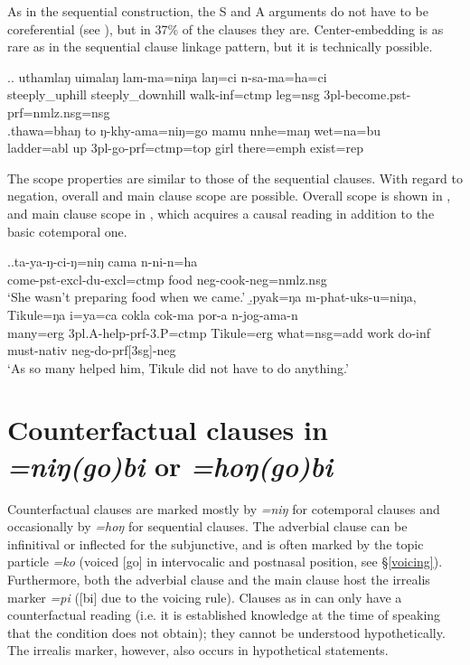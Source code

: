 As in the sequential construction, the S and A arguments do not have to be coreferential (see \Next), but in 37\% of the clauses they are. Center-embedding is as rare as in the sequential clause linkage pattern, but it is technically possible.

 \ex.\ag. uthamlaŋ uimalaŋ lam-ma=niŋa laŋ=ci n-sa-ma=ha=ci\\
		steeply\_uphill steeply\_downhill walk{\sc -inf=ctmp} leg{\sc =nsg} {\sc 3pl-}become{\sc .pst-prf=nmlz.nsg=nsg}\\ 
	\bg.thawa=bhaŋ    to  ŋ-khy-ama=niŋ=go                    mamu nnhe=maŋ    wet=na=bu\\
ladder{\sc =abl} up {\sc 3pl-}go{\sc -prf=ctmp=top} girl there{\sc =emph} exist{\sc [3sg]=rep}\\
 


The scope properties are similar to those of the sequential clauses. With regard  to negation, overall and main clause scope are possible. Overall scope is shown in \Next[a], and main clause scope in \Next[b], which acquires a causal reading in addition to the basic cotemporal one. 

\ex.\ag.ta-ya-ŋ-ci-ŋ=niŋ cama n-ni-n=ha\\
		come{\sc -pst-excl-du-excl=ctmp} food {\sc neg-}cook{\sc [pst;3.P]-neg=nmlz.nsg}\\
		‘She wasn’t preparing food when we came.’
	\b.\label{ex-tikule-do}\gll	pyak=ŋa m-phat-uks-u=niŋa, Tikule=ŋa   i=ya=ca cokla cok-ma    por-a n-jog-ama-n\\
		many={\sc erg} {\sc 3pl.A-}help{\sc -prf-3.P=ctmp} Tikule={\sc erg} what{\sc =nsg=add} work  do{\sc -inf} must{\sc -nativ} {\sc neg-}do{\sc -prf[3sg]-neg}\\
		‘As so many helped him, Tikule did not have to do anything.’ 



\section{Counterfactual clauses in \emph{=niŋ(go)bi} or  \emph{=hoŋ(go)bi} }\label{adv-cl-count}

Counterfactual clauses are marked mostly by \emph{=niŋ} for cotemporal clauses and occasionally by \emph{=hoŋ} for sequential clauses. The adverbial clause can be infinitival or inflected for the subjunctive, and is often marked by the topic particle \emph{=ko} (voiced [go]  in intervocalic and postnasal position, see §\ref{voicing}). Furthermore, both the adverbial clause and the main clause host the irrealis marker \emph{=pi} ([bi] due to the voicing rule). Clauses as in \Next can only have a counterfactual reading (i.e. it is established knowledge at the time of speaking that the condition does not obtain); they cannot be understood hypothetically. The irrealis marker, however, also occurs in hypothetical statements.



